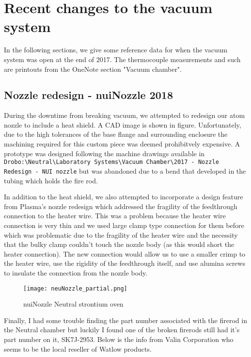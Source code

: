 \chapter{Recent changes to the vacuum system} \label{app:breakingVacuum}
In the following sections, we give some reference data for when the vacuum system was open at the end of 2017.
The thermocouple measurements and such are printouts from the OneNote section "Vacuum chamber".

\section{Nozzle redesign - nuiNozzle 2018}
During the downtime from breaking vacuum, we attempted to redesign our atom nozzle to include a heat shield. A CAD image is shown in figure. Unfortunately, due to the high tolerances of the base flange and surrounding enclosure the machining required for this custom piece was deemed prohibitvely expensive. A prototype was designed following the machine drawings available in \texttt{Drobo:\textbackslash Neutral\textbackslash Laboratory Systems\textbackslash Vacuum Chamber\textbackslash 2017 - Nozzle Redesign - NUI nozzle} but was abandoned due to a bend that developed in the tubing which holds the fire rod. 

In addition to the heat shield, we also attempted to incorporate a design feature from Plasma's nozzle redesign which addressed the fragility of the feedthrough connection to the heater wire. 
This was a problem because the heater wire connection is very thin and we used large clamp type connection for them before which was problematic due to the fragility of the heater wire and the necessity that the bulky clamp couldn't touch the nozzle body (as this would short the heater connection). 
The new connection would allow us to use a smaller crimp to the heater wire, use the rigidity of the feedthrough itself, and use alumina screws to insulate the connection from the nozzle body.
	
	\begin{figure} 
		\centerline{
		\texttt{[image: neuNozzle\_partial.png]}}
		\caption{nuiNozzle Neutral strontium oven}{}
		\label{fig:nuiNozzle}
	\end{figure}

Finally, I had some trouble finding the part number associated with the firerod in the Neutral chamber but luckily I found one of the broken firerods still had it's part number on it, SK7J-2953. 
Below is the info from Valin Corporation who seems to be the local reseller of Watlow products.

